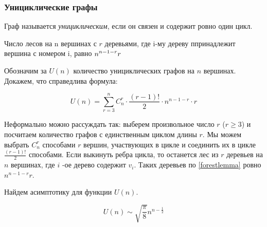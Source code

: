 \subsubsection{Унициклические графы}

\begin{Def}
	Граф называется \emph{унициклическим}, если он связен и содержит ровно один цикл.
\end{Def}

\begin{lemma} 
	Число лесов на n вершинах с $r$ деревьями, где i-му дереву ппринадлежит вершина с номером i, равно 
	$ \mathlarger n^{n-1-r}r$
\end{lemma}\label{forestlemma}


Обозначим за $U(n)$ количество унициклических графов на $n$ вершинах. Докажем, что справедлива формула:

$$
U(n)=\sum_{r=3}^{n} C_{n}^{r} \cdot \frac{(r-1)!}{2} \cdot n^{n-1-r} \cdot r
$$

Неформально можно рассуждать так: выберем произвольное число $r$ ($r \geqslant 3$) и посчитаем количество графов с единственным циклом длины $r$. Мы можем выбрать $C_{n}^{r}$ способами $r$ вершин, участвующих в цикле и соединить их в цикле $\frac{(r-1) !}{2}$ способами. Если выкинуть ребра цикла, то останется лес из $r$
деревьев на $n$ вершинах, где $i$ -ое дерево содержит $v_{i} .$ Таких деревьев по \ref{forestlemma} ровно $n^{n-1-r} r$.

Найдем асимптотику для функции $U(n)$.
\begin{theorem}
	$$U(n) \sim \sqrt{\frac{\pi}{8}} n^{n-\frac{1}{2}}$$
\end{theorem} \label{izvrat}

